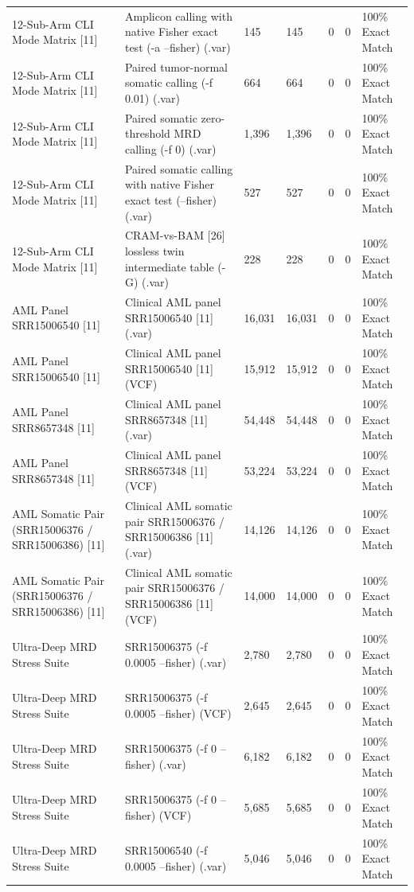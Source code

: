 \begin{table}[htbp]
{\begin{tabular}{lllllll}
12-Sub-Arm CLI Mode Matrix [11] & Amplicon calling with native Fisher exact test (-a --fisher) (.var) & 145 & 145 & 0 & 0 & 100\% Exact Match \\
12-Sub-Arm CLI Mode Matrix [11] & Paired tumor-normal somatic calling (-f 0.01) (.var) & 664 & 664 & 0 & 0 & 100\% Exact Match \\
12-Sub-Arm CLI Mode Matrix [11] & Paired somatic zero-threshold MRD calling (-f 0) (.var) & 1,396 & 1,396 & 0 & 0 & 100\% Exact Match \\
12-Sub-Arm CLI Mode Matrix [11] & Paired somatic calling with native Fisher exact test (--fisher) (.var) & 527 & 527 & 0 & 0 & 100\% Exact Match \\
12-Sub-Arm CLI Mode Matrix [11] & CRAM-vs-BAM [26] lossless twin intermediate table (-G) (.var) & 228 & 228 & 0 & 0 & 100\% Exact Match \\
AML Panel SRR15006540 [11] & Clinical AML panel SRR15006540 [11] (.var) & 16,031 & 16,031 & 0 & 0 & 100\% Exact Match \\
AML Panel SRR15006540 [11] & Clinical AML panel SRR15006540 [11] (VCF) & 15,912 & 15,912 & 0 & 0 & 100\% Exact Match \\
AML Panel SRR8657348 [11] & Clinical AML panel SRR8657348 [11] (.var) & 54,448 & 54,448 & 0 & 0 & 100\% Exact Match \\
AML Panel SRR8657348 [11] & Clinical AML panel SRR8657348 [11] (VCF) & 53,224 & 53,224 & 0 & 0 & 100\% Exact Match \\
AML Somatic Pair (SRR15006376 / SRR15006386) [11] & Clinical AML somatic pair SRR15006376 / SRR15006386 [11] (.var) & 14,126 & 14,126 & 0 & 0 & 100\% Exact Match \\
AML Somatic Pair (SRR15006376 / SRR15006386) [11] & Clinical AML somatic pair SRR15006376 / SRR15006386 [11] (VCF) & 14,000 & 14,000 & 0 & 0 & 100\% Exact Match \\
Ultra-Deep MRD Stress Suite & SRR15006375 (-f 0.0005 --fisher) (.var) & 2,780 & 2,780 & 0 & 0 & 100\% Exact Match \\
Ultra-Deep MRD Stress Suite & SRR15006375 (-f 0.0005 --fisher) (VCF) & 2,645 & 2,645 & 0 & 0 & 100\% Exact Match \\
Ultra-Deep MRD Stress Suite & SRR15006375 (-f 0 --fisher) (.var) & 6,182 & 6,182 & 0 & 0 & 100\% Exact Match \\
Ultra-Deep MRD Stress Suite & SRR15006375 (-f 0 --fisher) (VCF) & 5,685 & 5,685 & 0 & 0 & 100\% Exact Match \\
Ultra-Deep MRD Stress Suite & SRR15006540 (-f 0.0005 --fisher) (.var) & 5,046 & 5,046 & 0 & 0 & 100\% Exact Match \\

\end{tabular}}
\end{table}
